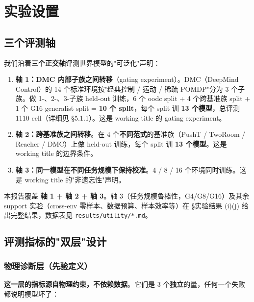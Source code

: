 \documentclass[11pt,a4paper]{article}
\begin{document}
\section{实验设置}

\subsection{三个评测轴}

我们沿着\textbf{三个正交轴}评测世界模型的"可泛化"声明：

\begin{enumerate}[leftmargin=2em]
    \item \textbf{轴 1：DMC 内部子族之间转移}（gating experiment）。DMC（DeepMind Control）的 14 个标准环境按"经典控制 / 运动 / 稀疏 POMDP"分为 3 个子族。做 1-、2-、3-子族 held-out 训练，6 个 oodc split + 4 个跨基准族 split + 1 个 G16 generalist split = \textbf{10 个 split}，每个 split 训 \textbf{13 个模型}，总评测 1110 cell（详细见 §5.1.1）。这是 working title 的 gating experiment。
    \item \textbf{轴 2：跨基准族之间转移}。在 4 个\textbf{不同范式}的基准族（PushT / TwoRoom / Reacher / DMC）上做 held-out 训练，每个 split 训 \textbf{13 个模型}。这是 working title 的边界条件。
    \item \textbf{轴 3：同一模型在不同任务规模下保持校准}。4 / 8 / 16 个环境同时训练。这是 working title 的"非遗忘性"声明。
\end{enumerate}

本报告覆盖 \textbf{轴 1 + 轴 2 + 轴 3}。轴 3（任务规模鲁棒性，G4/G8/G16）及其余 support 实验（cross-env 零样本、数据预算、样本效率等）在 §实验结果 (i)(j) 给出完整结果，数据表见 \texttt{results/utility/*.md}。

\subsection{评测指标的"双层"设计}

\subsubsection{物理诊断层（先验定义）}

\textbf{这一层的指标源自物理约束，不依赖数据}。它们是 3 个\textbf{独立}的量，任何一个失败都说明模型坏了：
\end{document}
